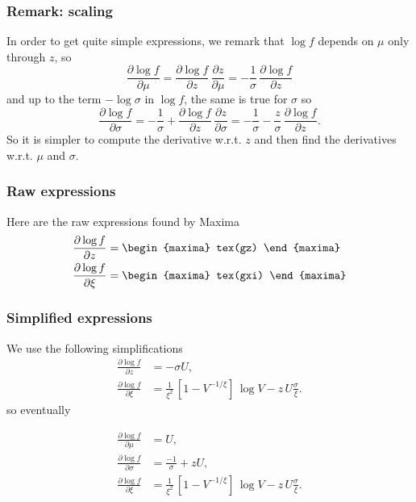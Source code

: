 \subsubsection*{Remark: scaling}
In order to get quite simple expressions, we remark that $\log f$
depends on $\mu$ only through $z$, so
$$
\frac{\partial \log f}{\partial \mu} = \frac{\partial \log f}{\partial z} \,
   \dfrac{\partial z}{\partial \mu} = -\frac{1}{\sigma} \, \frac{\partial \log f}{\partial z}
$$ 
and up to the term $-\log \sigma$ in $\log f$, the same is true for
$\sigma$ so
$$
\frac{\partial \log f}{\partial \sigma} =
-\frac{1}{\sigma} + \frac{\partial \log f}{\partial z} \, \dfrac{\partial z}{\partial \sigma} =
-\frac{1}{\sigma} -\frac{z}{\sigma} \, \frac{\partial \log f}{\partial z}.
$$ 
So it is simpler to compute the derivative w.r.t. $z$ and then find the
derivatives w.r.t. $\mu$ and $\sigma$.

\subsubsection*{Raw expressions}
Here are the raw expressions found by Maxima
{\color{MonVertF}
  \begin{align*}
  \frac{\partial \log f}{\partial z}
  &=
    \begin{maxima}
      tex(gz)
    \end{maxima}
  \\
  \frac{\partial \log f}{\partial \xi}
  &=
    \begin{maxima}
      tex(gxi)
    \end{maxima}
  \end{align*}
}

\subsubsection*{Simplified expressions}

We use the following simplifications
\begin{align*} 
  \frac{\partial \log f}{\partial z}
  &= - \sigma U, %
  \\
  \frac{\partial \log f}{\partial \xi}
  &= \frac{1}{\xi^2} \, [1 - V^{-1/\xi}]  \, \log V - z \, U \frac{\sigma}{\xi}.
\end{align*}
so eventually

{\color{red}
\begin{align*} 
  \frac{\partial \log f}{\partial \mu}
  &= U,
  \\
  \frac{\partial \log f}{\partial \sigma}
  &= \frac{-1}{\sigma} + z U,
  \\
  \frac{\partial \log f}{\partial \xi}
  &= \frac{1}{\xi^2} \, [1 - V^{-1/\xi}]  \, \log V - z \, U \frac{\sigma}{\xi}.
\end{align*}
}


